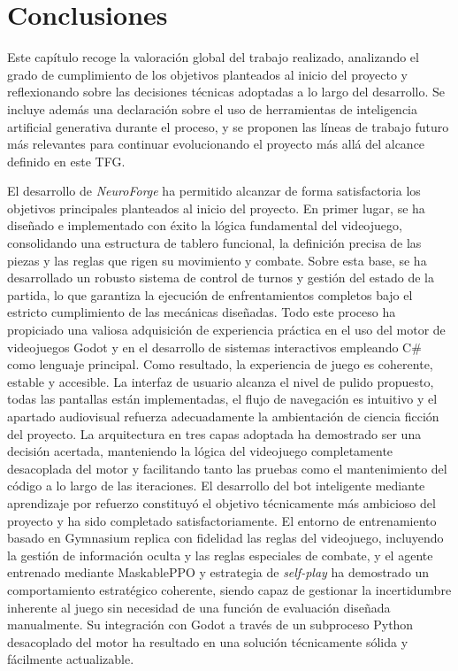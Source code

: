 \chapter{Conclusiones}

Este capítulo recoge la valoración global del trabajo realizado, analizando el grado
de cumplimiento de los objetivos planteados al inicio del proyecto y reflexionando
sobre las decisiones técnicas adoptadas a lo largo del desarrollo. Se incluye además
una declaración sobre el uso de herramientas de inteligencia artificial generativa
durante el proceso, y se proponen las líneas de trabajo futuro más relevantes para
continuar evolucionando el proyecto más allá del alcance definido en este TFG.

El desarrollo de \textit{NeuroForge} ha permitido alcanzar de forma satisfactoria los
objetivos principales planteados al inicio del proyecto. En primer lugar, se ha
diseñado e implementado con éxito la lógica fundamental del videojuego, consolidando
una estructura de tablero funcional, la definición precisa de las piezas y las reglas
que rigen su movimiento y combate. Sobre esta base, se ha desarrollado un robusto
sistema de control de turnos y gestión del estado de la partida, lo que garantiza la
ejecución de enfrentamientos completos bajo el estricto cumplimiento de las mecánicas
diseñadas. Todo este proceso ha propiciado una valiosa adquisición de experiencia
práctica en el uso del motor de videojuegos Godot y en el desarrollo de sistemas
interactivos empleando C\# como lenguaje principal. Como resultado, la experiencia de
juego es coherente, estable y accesible. La interfaz de usuario alcanza el nivel de
pulido propuesto, todas las pantallas están implementadas, el flujo de navegación es
intuitivo y el apartado audiovisual refuerza adecuadamente la ambientación de ciencia
ficción del proyecto. La arquitectura en tres capas adoptada ha demostrado ser una
decisión acertada, manteniendo la lógica del videojuego completamente desacoplada del
motor y facilitando tanto las pruebas como el mantenimiento del código a lo largo de
las iteraciones. El desarrollo del bot inteligente mediante aprendizaje por refuerzo
constituyó el objetivo técnicamente más ambicioso del proyecto y ha sido completado
satisfactoriamente. El entorno de entrenamiento basado en Gymnasium replica con
fidelidad las reglas del videojuego, incluyendo la gestión de información oculta y
las reglas especiales de combate, y el agente entrenado mediante MaskablePPO y
estrategia de \textit{self-play} ha demostrado un comportamiento estratégico
coherente, siendo capaz de gestionar la incertidumbre inherente al juego sin necesidad
de una función de evaluación diseñada manualmente. Su integración con Godot a través
de un subproceso Python desacoplado del motor ha resultado en una solución técnicamente
sólida y fácilmente actualizable.

